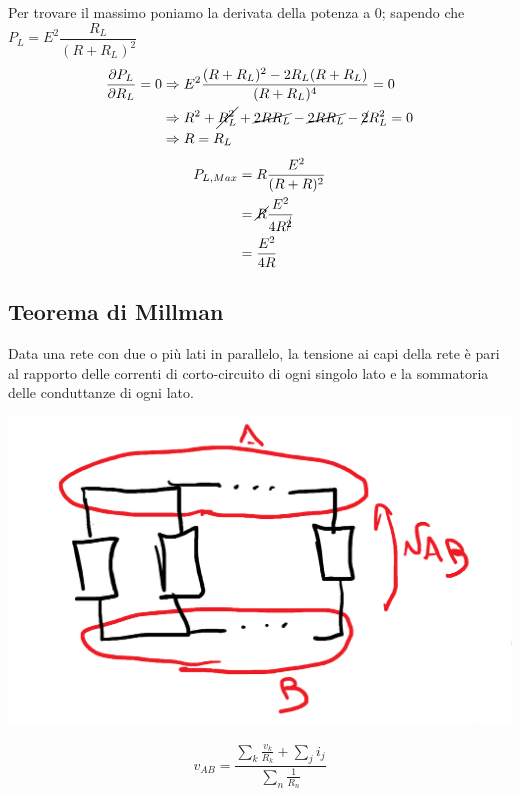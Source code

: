 \documentclass{article}
\begin{document}
Per trovare il massimo poniamo la derivata della potenza a 0; sapendo che $P_L = E^2 \dfrac{R_L}{(R+R_L)^2}$
\begin{align*}
    \dfrac{\partial P_L}{\partial R_L}=0 &\Rightarrow E^2 \dfrac{(R+R_L)^2 - 2R_L(R+R_L)}{(R+R_L)^4}=0\\
    & \Rightarrow R^2 + \cancel{R^2_L} + \cancel{2RR_L} - \cancel{2RR_L} -\cancel{2}R^2_L = 0\\
    &\Rightarrow R=R_L
\end{align*} 
\begin{align*}
    P_{L,Max} &= R \dfrac{E^2}{(R+R)^2}\\
    &= \cancel{R} \dfrac{E^2}{4R^{\cancel{2}}}\\
    &= \dfrac{E^2}{4R}
\end{align*}



\subsection{Teorema di Millman}
Data una rete con due o più lati in parallelo, la tensione ai capi della rete è pari al rapporto delle correnti di corto-circuito di ogni singolo lato e la sommatoria delle conduttanze di ogni lato.
\begin{center}
    \includegraphics[scale=0.26]{Image/Th_Millman_0.png}
\end{center}
\[
    v_{AB} = \frac{\sum\limits_k \frac{v_k}{R_k} + \sum\limits_j i_j}{\sum\limits_n\frac{1}{R_n}}
\]
\end{document}
